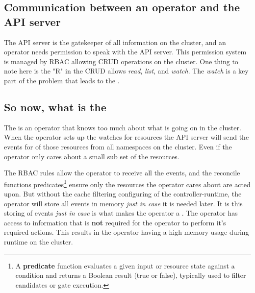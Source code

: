 \subsection{Communication between an operator and the API server}
The API server is the gatekeeper of all information on the cluster, and an operator needs permission to speak with the API server.
This permission system is managed by RBAC\cite{noauthor_using_nodate}
allowing CRUD\cite{noauthor_create_2026} operations on the cluster.
One thing to note here is the "R" in the CRUD allows \textit{read}, \textit{list}, and \textit{watch}.
The \textit{watch} is a key part of the problem that leads to the \nn{}.

\subsection{So now, what is the \nn{}}
The \nn{} is an operator that knows too much about what is going on in the cluster.
When the operator sets up the watches for resources the API server will send the events for of those resources from all namespaces\cite{noauthor_namespaces_nodate} on the cluster.
Even if the operator only cares about a small sub set of the resources.

The RBAC rules allow the operator to receive all the events, and the reconcile functions predicates\footnote{A \textbf{predicate} function evaluates a given input or resource state against a condition and returns a Boolean result (true or false), typically used to filter candidates or gate execution.} ensure only the resources the operator cares about are acted upon.
But without the cache filtering configuring of the controller-runtime\cite{noauthor_kubernetes-sigscontroller-runtime_2026}, the operator will store all events in memory \textit{just in case} it is needed later.
It is this storing of events \textit{just in case} is what makes the operator a \nn{}.
The operator has access to information that is \textbf{not} required for the operator to perform it's required actions.
This results in the operator having a high memory usage during runtime on the cluster.




